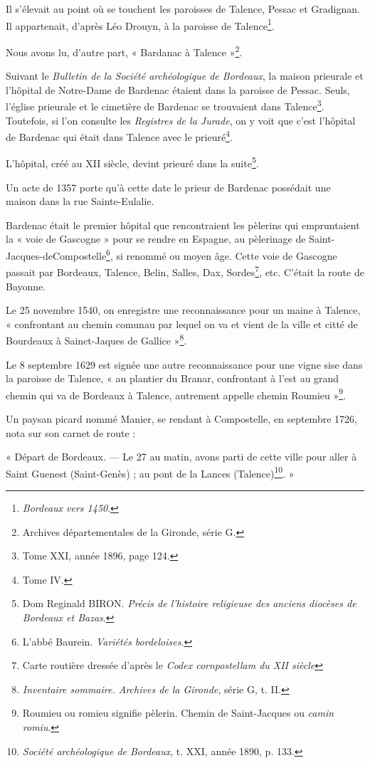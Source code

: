 Il s'élevait au point où se touchent les paroisses de Talence, Pessac et Gradignan. Il appartenait, d'après Léo Drouyn, à la paroisse de Talence\footnote{\textit{Bordeaux vers 1450}.}.

Nous avons lu, d'autre part, « Bardanac à Talence »\footnote{Archives départementales de la Gironde, série G.}.

Suivant le \textit{Bulletin de la Société archéologique de Bordeaux}, la maison prieurale et l'hôpital de Notre-Dame de Bardenac étaient dans la paroisse de Pessac. Seuls, l'église prieurale et le cimetière de Bardenac se trouvaient dans Talence\footnote{Tome XXI, année 1896, page 124.}. Toutefois, si l'on consulte les \textit{Registres de la Jurade}, on y voit que c'est l'hôpital de Bardenac qui était dans Talence avec le prieuré\footnote{Tome IV.}.

L'hôpital, créé au XII\ieme{} siècle, devint prieuré dans la suite\footnote{Dom Reginald BIRON. \textit{Précis de l'histoire religieuse des anciens diocèses de Bordeaux et Bazas}.}.

Un acte de 1357 porte qu'à cette date le prieur de Bardenac possédait une maison dans la rue Sainte-Eulalie.

Bardenac était le premier hôpital que rencontraient les pèlerins qui empruntaient la « voie de Gascogne » pour se rendre en Espagne, au pèlerinage de Saint-Jacques-deCompostelle\footnote{L'abbé Baurein. \textit{Variétés bordeloises}.}, si renommé ou moyen âge. Cette voie de Gascogne passait par Bordeaux, Talence, Belin, Salles, Dax, Sordes\footnote{Carte routière dressée d'après le \textit{Codex cornpostellam du XII\ieme{} siècle}}, etc. C'était la route de Bayonne.

Le 25 novembre 1540, on enregistre une reconnaissance pour un maine à Talence, « confrontant au chemin comunau par lequel on va et vient de la ville et citté de Bourdeaux à Sainct-Jaques de Gallice »\footnote{\textit{Inventaire sommaire. Archives de la Gironde}, série G, t. II.}.

Le 8 septembre 1629 est signée une autre reconnaissance pour une vigne sise dans la paroisse de Talence, « au plantier du Branar, confrontant à l'est au grand chemin qui va de Bordeaux à Talence, autrement appelle chemin Roumieu »\footnote{Roumieu ou romieu signifie pèlerin. Chemin de Saint-Jacques ou \textit{camin romiu}.}.

Un paysan picard nommé Manier, se rendant à Compostelle, en septembre 1726, nota sur son carnet de route :

« Départ de Bordeaux. — Le 27 au matin, avons parti de cette ville pour aller à Saint Guenest (Saint-Genès) ; au pont de la Lances (Talence)\footnote{\textit{Société archéologique de Bordeaux}, t. XXI, année 1890, p. 133.}. »

